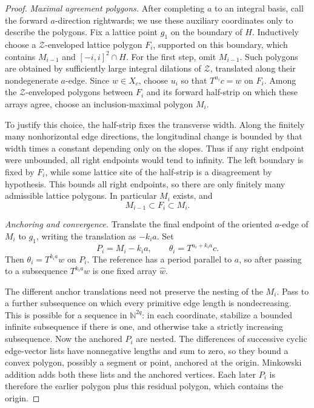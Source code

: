 \documentclass[11pt]{article}
\numberwithin{equation}{section}
\theoremstyle{definition}
\theoremstyle{remark}
\newcommand{\ZZ}{\mathcal Z}
\begin{document}
\begin{proof}
\emph{Maximal agreement polygons.} After completing $a$ to an integral basis, call the forward
$a$-direction rightwards; we use these auxiliary coordinates only to describe the polygons.
Fix a lattice point $g_1$ on the boundary of $H$. Inductively choose a $\ZZ$-enveloped lattice polygon $F_i$, supported on this boundary, which contains $M_{i-1}$ and $[-i,i]^2\cap H$. For the first step, omit $M_{i-1}$. Such polygons are obtained by sufficiently large integral dilations of $\ZZ$, translated along their nondegenerate $a$-edge. Since $w\in X_c$, choose $u_i$ so that $T^{u_i}c=w$ on $F_i$. Among the $\ZZ$-enveloped polygons between $F_i$ and its forward half-strip on which these arrays agree, choose an inclusion-maximal polygon $M_i$.

To justify this choice, the half-strip fixes the transverse width. Along the finitely many
nonhorizontal edge directions, the longitudinal change is bounded by that width times a constant
depending only on the slopes. Thus if any right endpoint were unbounded, all right endpoints would
tend to infinity. The left boundary is fixed by $F_i$, while some lattice site of the half-strip is
a disagreement by hypothesis. This bounds all right endpoints, so there are only finitely many admissible
lattice polygons. In particular $M_i$ exists, and
\[
 M_{i-1}\subset F_i\subset M_i.
\]

\smallskip\noindent
\emph{Anchoring and convergence.} Translate the final endpoint of the oriented $a$-edge of $M_i$ to $g_1$, writing the translation as $-k_i a$. Set
\[
 P_i=M_i-k_i a,\qquad \theta_i=T^{u_i+k_i a}c.
\]
Then $\theta_i=T^{k_i a}w$ on $P_i$. The reference has a period parallel to $a$, so after passing to
a subsequence $T^{k_i a}w$ is one fixed array $\widehat w$.

The different anchor translations need not preserve the nesting of the $M_i$. Pass to a further
subsequence on which every primitive edge length is nondecreasing. This is possible for a sequence
in $\mathbb N^{2q}$: in each coordinate, stabilize a bounded infinite subsequence if there is one,
and otherwise take a strictly increasing subsequence. Now the anchored $P_i$ are nested. The
differences of successive cyclic edge-vector lists have nonnegative lengths and sum to zero, so
they bound a convex polygon, possibly a segment or point, anchored at the origin. Minkowski addition
adds both these lists and the anchored vertices. Each later $P_i$ is therefore the earlier polygon
plus this residual polygon, which contains the origin.


\end{proof}
\end{document}
